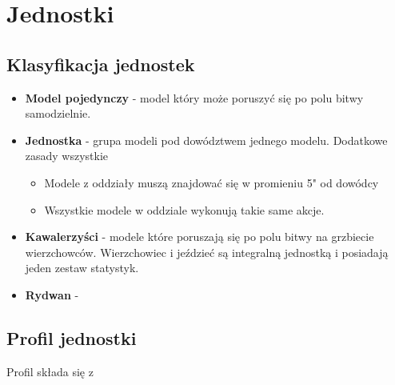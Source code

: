 \chapter{Jednostki}

\section{Klasyfikacja jednostek}
\begin{itemize}
    \item \textbf{Model pojedynczy} - model który może poruszyć się po polu bitwy samodzielnie.
    \item \textbf{Jednostka} - grupa modeli pod dowództwem jednego modelu.
    Dodatkowe zasady wszystkie
    \begin{itemize}
        \item Modele z oddziały muszą znajdować się w promieniu 5" od dowódcy
        \item Wszystkie modele w oddziale wykonują takie same akcje.
    \end{itemize}
    \item \textbf{Kawalerzyści} - modele które poruszają się po polu bitwy na grzbiecie wierzchowców. Wierzchowiec i jeździeć są integralną jednostką i posiadają jeden zestaw statystyk.
    \item \textbf{Rydwan} - 
\end{itemize}

\section{Profil jednostki}
Profil składa się z

